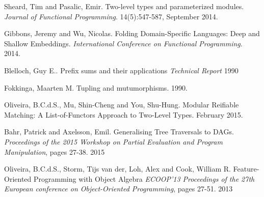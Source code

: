 \documentclass{jfp1}
\begin{document}
\begin{thebibliography}{}

  Sheard, Tim and Pasalic, Emir.
  Two-level types and parameterized modules.
  \emph{Journal of Functional Programming}.
  14(5):547-587, September 2014.

  Gibbons, Jeremy and Wu, Nicolas.
  Folding Domain-Specific Languages: Deep and Shallow Embeddings.
  \emph{International Conference on Functional Programming}.
  2014.

  Blelloch, Guy E..
  Prefix sums and their applications
  \emph{Technical Report}
  1990

  Fokkinga, Maarten M.
  Tupling and mutumorphisms.
  1990.

  Oliveira, B.C.d.S., Mu, Shin-Cheng and You, Shu-Hung.
  Modular Reifiable Matching: A List-of-Functors Approach to Two-Level Types.
  February 2015.

  Bahr, Patrick and Axelsson, Emil.
  Generalising Tree Traversals to DAGs.
  \emph{Proceedings of the 2015 Workshop on Partial Evaluation and Program Manipulation},
  pages 27-38.
  2015

  Oliveira, B.C.d.S., Storm, Tijs van der, Loh, Alex and Cook, William R.
  Feature-Oriented Programming with Object Algebra
  \emph{ECOOP'13 Proceedings of the 27th European conference on Object-Oriented Programming},
  pages 27-51.
  2013

\end{thebibliography}
\end{document}
